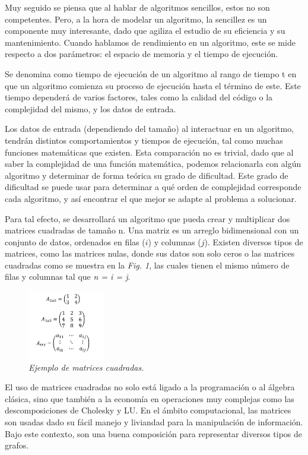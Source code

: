 \documentclass[11pt, twocolumn]{llncs}
\begin{document}
Muy seguido se piensa que al hablar de algoritmos sencillos, estos no son competentes. Pero, a la hora de modelar un algoritmo, la sencillez es un componente muy interesante, dado que agiliza el estudio de su eficiencia y su mantenimiento. Cuando hablamos de rendimiento en un algoritmo, este se mide respecto a dos parámetros: el espacio de memoria y el tiempo de ejecución.

Se denomina como tiempo de ejecución de un algoritmo al rango de tiempo t en que un algoritmo comienza su proceso de ejecución hasta el término de este. Este tiempo dependerá de varios factores, tales como la calidad del código o la complejidad del mismo, y los datos de entrada.

Los datos de entrada (dependiendo del tamaño) al interactuar en un algoritmo, tendrán distintos comportamientos y tiempos de ejecución, tal como muchas funciones matemáticas que existen. Esta comparación no es trivial, dado que al saber la complejidad de una función matemática, podemos relacionarla con algún algoritmo y determinar de forma teórica su grado de dificultad. Este grado de dificultad se puede usar para determinar a qué orden de complejidad corresponde cada algoritmo, y así encontrar el que mejor se adapte al problema a solucionar.

Para tal efecto, se desarrollará un algoritmo que pueda crear y multiplicar dos matrices cuadradas de tamaño n. Una matriz es un arreglo bidimensional con un conjunto de datos, ordenados en filas ($i$) y columnas ($j$). Existen diversos tipos de matrices, como las matrices nulas, donde sus datos son solo ceros o las matrices cuadradas como se muestra en la \textit{Fig. 1}, las cuales tienen el mismo número de filas y columnas tal que \textit{n = i = j}.

\begin{figure}
\caption{\textit{\label{fig:matrices}Ejemplo de matrices cuadradas.}}
\centering
\includegraphics[width=0.3\textwidth]{matrices.png}
\end{figure}

El uso de matrices cuadradas no solo está ligado a la programación o al álgebra clásica, sino que también a la economía en operaciones muy complejas como las descomposiciones de Cholesky y LU. En el ámbito computacional, las matrices son usadas dado su fácil manejo y liviandad para la manipulación de información. Bajo este contexto, son una buena composición para representar diversos tipos de grafos.
\end{document}
